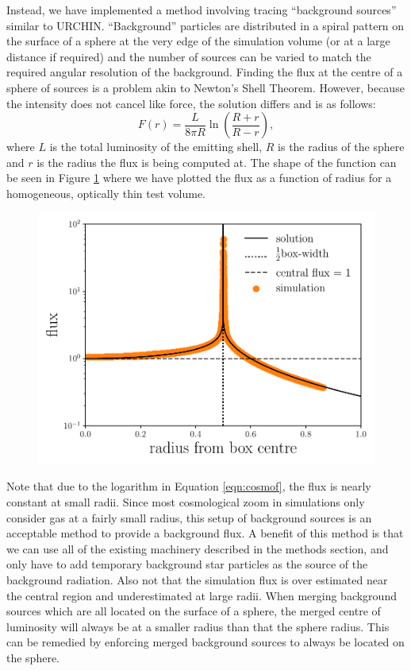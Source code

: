 \documentclass[fleq,usenatbib]{mnras}
\begin{document}
Instead, we have implemented a method involving tracing ``background sources'' 
similar to URCHIN. ``Background'' particles are distributed in a spiral 
pattern on the surface of a sphere at the very edge of the simulation volume 
(or at a large distance if required) and the number of sources can be varied 
to match the required angular resolution of the background. Finding the flux 
at the centre of a sphere of sources is a problem akin to Newton's Shell 
Theorem. However, because the intensity does not cancel like force, the 
solution differs and is as follows:
\begin{equation}
\label{eqn:cosmof}
F(r) = \frac{L}{8\pi R} \ln \left(\frac{R+r}{R-r}\right),
\end{equation}
where $L$ is the total luminosity of the emitting shell, $R$ is the radius of 
the sphere and $r$ is the radius the flux is being computed at. The shape of 
the function can be seen in Figure \ref{fig:cosmof} where we have plotted the 
flux as a function of radius for a homogeneous, optically thin test volume.
\begin{figure}
\includegraphics[width=1\linewidth]{Figures/cosmofield.pdf}
\caption{}
\label{fig:cosmof}
\end{figure}

Note that due to the logarithm in Equation \ref{eqn:cosmof}, the flux is 
nearly constant at small radii. Since most cosmological zoom in simulations 
only consider gas at a fairly small radius, this setup of background sources 
is an acceptable method to provide a background flux. A benefit of this method 
is that we can use all of the existing machinery described in the methods 
section, and only have to add temporary background star particles as the 
source of the background radiation. Also not that the simulation flux is over 
estimated near the central region and underestimated at large radii. When 
merging background sources which are all located on the surface of a sphere, 
the merged centre of luminosity will always be at a smaller radius than that 
the sphere radius. This can be remedied by enforcing merged background sources 
to always be located on the sphere. 
\end{document}
